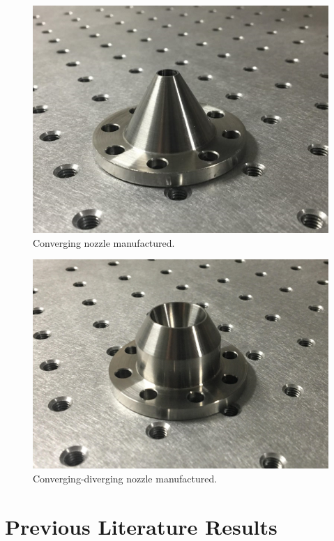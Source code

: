 \begin{figure}[H] 
	\centering
	\includegraphics[scale=1.35]{fig12.PNG} 
	\caption{Converging nozzle manufactured.}
	\label{fig:12}
\end{figure}

\begin{figure}[H] 
	\centering
	\includegraphics[scale=1.3]{fig13.PNG} 
	\caption{Converging-diverging nozzle manufactured.}
	\label{fig:13}
\end{figure}

\section{Previous Literature Results} \label{app:litresults}

